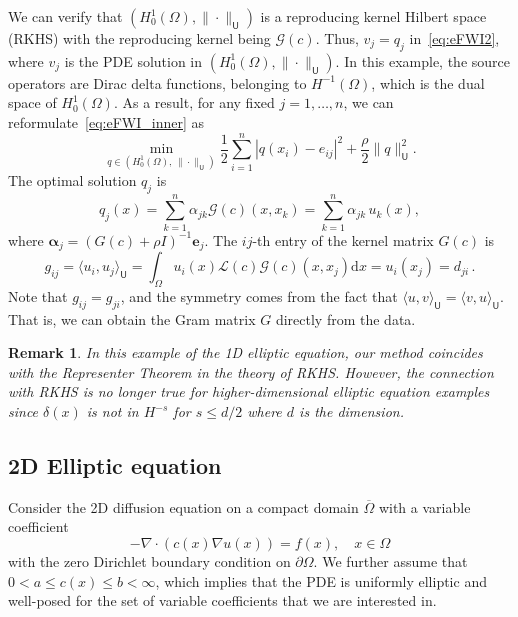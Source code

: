 \documentclass[12pt]{amsart}
\newtheorem{rem}{Remark}
\begin{document}
We can verify that $\left(H_0^1(\Omega), \|\cdot \|_{\mathsf{U}}\right)$ is a reproducing kernel Hilbert space (RKHS) with the reproducing kernel being $\mathcal{G}(c)$. Thus, $v_j = q_j$ in~\eqref{eq:eFWI2}, where $v_j$ is the PDE solution in $\left(H_0^1(\Omega), \|\cdot \|_{\mathsf{U}}\right)$. In this example, the source operators are Dirac delta functions,  belonging to $H^{-1}(\Omega)$, which is the dual space of $H_0^1(\Omega)$.  As a result, for any fixed $j = 1,\ldots,n$, we can reformulate~\eqref{eq:eFWI_inner} as
\[
\min_{q \in \left(H_0^1(\Omega), \,  \|\cdot \|_{\mathsf{U}}\right)}   {\textstyle\frac{1}{2}}\sum_{i=1}^n |q(x_i) - e_{ij}|^2 +  {\textstyle\frac{\rho}{2}} \|q\|_{\mathsf{U}}^2.
\]
The optimal solution $q_j$ is
\[
q_j(x) = \sum_{k=1}^n \alpha_{jk} \mathcal{G}(c) (x,x_k) = \sum_{k=1}^n \alpha_{jk} \, u_k(x) ,
\]
where $\boldsymbol{\alpha}_{j} = (G(c) + \rho I)^{-1} \boldsymbol{e}_{j}$. The $ij$-th entry of the kernel matrix $G(c)$ is  
$$
g_{ij} = \langle u_i, u_j\rangle_{\mathsf{U}} =  \int_\Omega u_i(x) \mathcal{L}(c) \mathcal{G}(c)(x,x_j)\mathrm{d}x =u_i(x_j) = d_{ji}\,. 
$$
Note that $g_{ij} = g_{ji}$, and the symmetry comes from the fact that $\langle u, v\rangle_{\mathsf{U}} = \langle v, u\rangle_{\mathsf{U}}$. That is, we can obtain the Gram matrix $G$ directly from the data.

\begin{rem}
   In this example of the 1D elliptic equation, our method coincides with the Representer Theorem in the theory of RKHS. However, the connection with RKHS is no longer true for higher-dimensional elliptic equation examples since $\delta(x)$ is not in $H^{-s}$ for $s \leq d/2$ where $d$ is the dimension.
\end{rem}
\subsection{2D Elliptic equation}
Consider the 2D diffusion equation on a compact domain $\overline{\Omega}$ with a variable coefficient
\begin{equation}\label{eq:2d_poisson}
- \nabla \cdot \left( c(x) \nabla u(x) \right) = f(x),\quad x\in \Omega
\end{equation}
with the zero Dirichlet boundary condition on $\partial {\Omega}$. 
We further  assume that $0 < a \leq c(x) \leq b < \infty$, which implies that the PDE is uniformly elliptic and well-posed for the set of variable coefficients that we are interested in.
\end{document}
